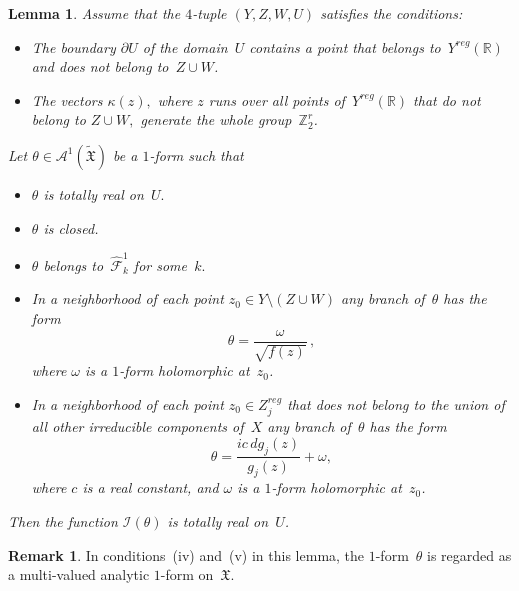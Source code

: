 \documentclass[reqno,tbtags,12pt]{amsart}
\numberwithin{equation}{section}
\newcommand{\R}{\mathbb{R}}
\newcommand{\Z}{\mathbb{Z}}
\newcommand{\FX}{\mathfrak{X}}
\newcommand{\tFX}{\widetilde{\mathfrak{X}}}
\newcommand{\hCF}{\widehat{\mathcal{F}}}
\newcommand{\A}{\mathcal{A}}
\newcommand{\I}{\mathcal{I}}
\newtheorem{lem}[theorem]{Lemma}
\theoremstyle{definition}
\newtheorem{remark}[theorem]{Remark}
\begin{document}
\begin{lem}\label{lem_tech}
Assume that the $4$-tuple $(Y,Z,W,U)$ satisfies the conditions: 
\begin{itemize}
\item[(A)] The boundary $\partial U$ of the domain~$U$ contains a point that belongs to~$Y^{reg}(\R)$ and does not belong to~$Z\cup W$. 
\item[(B)] The vectors $\kappa(z),$  where $z$ runs over all points of\/~$Y^{reg}(\R)$ that do not belong to $Z\cup W,$ generate the whole group~$\Z_2^{r}$.
\end{itemize}
Let $\theta\in\A^1(\tFX)$ be a $1$-form  such that
\begin{itemize}
\item[(i)] $\theta$ is totally real on~$U.$
\item[(ii)] $\theta$ is closed.
\item[(iii)] $\theta$ belongs to~$\hCF_k^1$ for some~$k.$
\item[(iv)]  In a neighborhood of each point $z_0\in Y\setminus (Z\cup W)$ any branch of\/~$\theta$ has the form
\begin{equation}\label{eq_omega}
\theta=\frac{\omega}{\sqrt{f(z)}}\,,
\end{equation}
where $\omega$ is a $1$-form holomorphic at~$z_0$.
\item[(v)] In a neighborhood of each point $z_0\in Z_j^{reg}$ that does not belong to the union of all other irreducible components of~$X$ any branch of\/~$\theta$ has the form
\begin{equation}\label{eq_omega2}
\theta=\frac{ic\,dg_j(z)}{g_j(z)}+\omega,
\end{equation}
where $c$ is a real constant, and\/ $\omega$ is a $1$-form holomorphic at~$z_0$.
\end{itemize}
Then the function 
$\I(\theta)$
is totally real on~$U$.
\end{lem}

\begin{remark}
In conditions~(iv) and~(v) in this lemma, the $1$-form~$\theta$ is regarded as a multi-valued analytic $1$-form on~$\FX$.
\end{remark}
\end{document}
